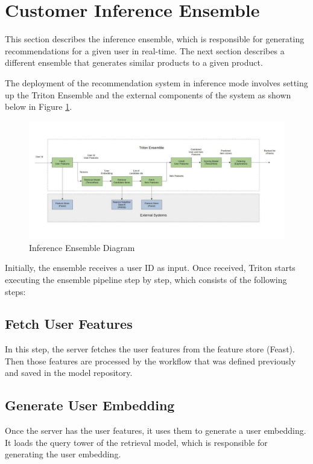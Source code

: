 \section{Customer Inference Ensemble}

This section describes the inference ensemble, which is responsible for generating recommendations for a given user in real-time.
The next section describes a different ensemble that generates similar products to a given product.

The deployment of the recommendation system in inference mode involves setting up the Triton Ensemble and the external components of the system as shown below in Figure \ref{fig:DeploymentDiagram}.

\begin{figure}[H]
    \centering
    \includegraphics[width=\textwidth]{assets/deployment.jpg}
    \caption{Inference Ensemble Diagram}
    \label{fig:DeploymentDiagram}
\end{figure}

Initially, the ensemble receives a user ID as input. Once received, Triton starts executing the ensemble pipeline step by step, which consists of the following steps:

\subsection{Fetch User Features}

In this step, the server fetches the user features from the feature store (Feast). Then those features are processed by the workflow that was defined previously and saved in the model repository.

\subsection{Generate User Embedding}

Once the server has the user features, it uses them to generate a user embedding. 
It loads the query tower of the retrieval model, which is responsible for generating the user embedding. 

